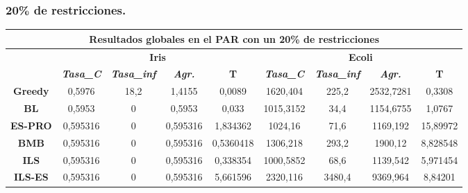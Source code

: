 \documentclass[12pt, spanish]{article}
\begin{document}
\subsubsection{20\% de restricciones.}


\begin{table}[H]
\begin{tabular}{|c|c|c|c|c|c|c|c|c|}
\hline
\multicolumn{9}{|c|}{\textbf{Resultados globales en el PAR con un 20\% de restricciones}}                                                                                                                                               \\ \hline
\multicolumn{1}{|l|}{\multirow{2}{*}{}} & \multicolumn{4}{c|}{\textbf{Iris}}                                                            & \multicolumn{4}{c|}{\textbf{Ecoli}}                                                           \\ \cline{2-9} 
\multicolumn{1}{|l|}{}                  & \textit{\textbf{Tasa\_C}} & \textit{\textbf{Tasa\_inf}} & \textit{\textbf{Agr.}} & \textbf{T} & \textit{\textbf{Tasa\_C}} & \textit{\textbf{Tasa\_inf}} & \textit{\textbf{Agr.}} & \textbf{T} \\ \hline
\textbf{Greedy}                         & 0,5976                    & 18,2                        & 1,4155                 & 0,0089     & 1620,404                  & 225,2                       & 2532,7281              & 0,3308     \\ \hline
\textbf{BL}                             & 0,5953                    & 0                           & 0,5953                 & 0,033      & 1015,3152                 & 34,4                        & 1154,6755              & 1,0767     \\ \hline
\textbf{ES-PRO}                & 0,595316                  & 0                           & 0,595316               & 1,834362   & 1024,16                   & 71,6                        & 1169,192               & 15,89972   \\ \hline
\textbf{BMB}                            & 0,595316                  & 0                           & 0,595316               & 0,5360418  & 1306,218                  & 293,2                       & 1900,12                & 8,828548   \\ \hline
\textbf{ILS}                            & 0,595316                  & 0                           & 0,595316               & 0,338354   & 1000,5852                 & 68,6                        & 1139,542               & 5,971454   \\ \hline
\textbf{ILS-ES}                         & 0,595316                  & 0                           & 0,595316               & 5,661596   & 2320,116                  & 3480,4                      & 9369,964               & 8,84201    \\ \hline
\end{tabular}
\end{table}
\end{document}
